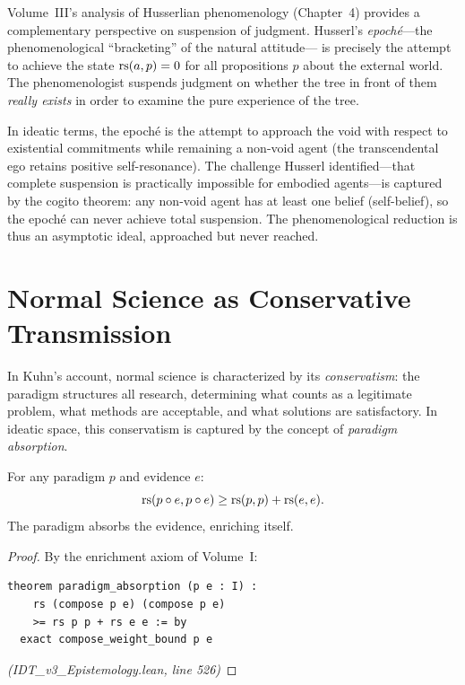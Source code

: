 \begin{remark}
Volume~III's analysis of Husserlian phenomenology (Chapter~4) provides a
complementary perspective on suspension of judgment. Husserl's
\emph{epoch\'{e}}---the phenomenological ``bracketing'' of the natural attitude---
is precisely the attempt to achieve the state $\mathrm{rs}(a, p) = 0$ for all
propositions $p$ about the external world. The phenomenologist suspends
judgment on whether the tree in front of them \emph{really exists} in order
to examine the pure experience of the tree.

In ideatic terms, the epoch\'{e} is the attempt to approach the void with
respect to existential commitments while remaining a non-void agent (the
transcendental ego retains positive self-resonance). The challenge Husserl
identified---that complete suspension is practically impossible for embodied
agents---is captured by the cogito theorem: any non-void agent has at least
one belief (self-belief), so the epoch\'{e} can never achieve total suspension.
The phenomenological reduction is thus an asymptotic ideal, approached but
never reached.
\end{remark}

\section{Normal Science as Conservative Transmission}

In Kuhn's account, normal science is characterized by its \emph{conservatism}:
the paradigm structures all research, determining what counts as a legitimate
problem, what methods are acceptable, and what solutions are satisfactory.
In ideatic space, this conservatism is captured by the concept of
\emph{paradigm absorption}.

\begin{theorem}
\label{thm:paradigm-absorption}
For any paradigm $p$ and evidence $e$:
\[
  \mathrm{rs}(p \circ e, p \circ e) \geq \mathrm{rs}(p, p) + \mathrm{rs}(e, e).
\]
The paradigm absorbs the evidence, enriching itself.
\end{theorem}

\begin{proof}
By the enrichment axiom of Volume~I:
\begin{lstlisting}
theorem paradigm_absorption (p e : I) :
    rs (compose p e) (compose p e)
    >= rs p p + rs e e := by
  exact compose_weight_bound p e
\end{lstlisting}
\textit{(IDT\_v3\_Epistemology.lean, line 526)}
\end{proof}

